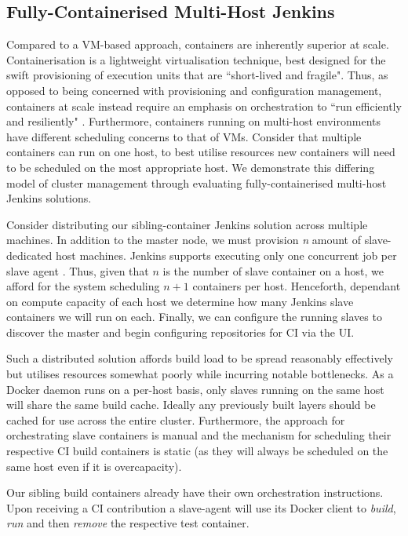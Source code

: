\documentclass{report}
\begin{document}
\subsection{Fully-Containerised Multi-Host Jenkins}
Compared to a VM-based approach, containers are inherently superior at scale.
Containerisation is a lightweight virtualisation technique, best designed for 
the swift provisioning of execution units that are ``short-lived and fragile".
Thus, as opposed to being concerned with provisioning and configuration management,
containers at scale instead require an emphasis on orchestration to ``run efficiently
and resiliently" \citep{Rensin}. Furthermore, containers running on multi-host environments
have different scheduling concerns to that of VMs. Consider that multiple containers can run
on one host, to best utilise resources new containers will need to be scheduled on the most appropriate
host. We demonstrate this differing model of cluster management through evaluating fully-containerised multi-host Jenkins 
solutions.
\par
Consider distributing our sibling-container Jenkins solution across multiple machines.
In addition to the master node, we must provision \textit{n} amount of slave-dedicated host machines. 
Jenkins supports executing only one concurrent job per slave agent \citep{Smart}. Thus, given that \(n\) is the number
of slave container on a host, we afford for the system scheduling \(n+1\) containers per host. Henceforth, 
dependant on compute capacity of each host we determine how many Jenkins slave containers we will run on each. 
Finally,  we can configure the running slaves to discover the master and begin configuring repositories for CI via the UI. 
\par 
Such a distributed solution
affords build load to be spread reasonably effectively but utilises resources somewhat poorly while incurring notable bottlenecks.
As a Docker daemon runs on a per-host basis, only slaves running on the same host will share the same
build cache. Ideally any previously built layers should be cached for use across the entire cluster.
Furthermore, the approach for orchestrating slave containers
is manual and the mechanism for scheduling their respective CI build containers is static (as they will always
be scheduled on the same host even if it is overcapacity).
\par
Our sibling build containers already have their own orchestration instructions. Upon receiving a CI contribution a 
slave-agent will use its Docker client to \textit{build}, \textit{run} and then \textit{remove} the respective test container.
\end{document}
